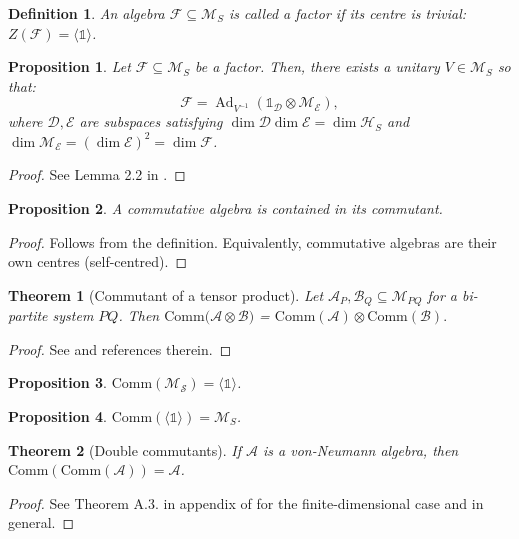 \documentclass[11pt, twocolumn, floatfix, superscriptaddress, aps, prb, raggedbottom]{revtex4-2}
\newtheorem{theorem}{Theorem}[section]
\newtheorem{definition}{Definition}[section]
\newtheorem{proposition}{Proposition}[section]
\newcommand\marcell[1]{\textcolor{red}{\textbf{#1}}}
\newcommand{\comm}{\mathrm{Comm}}
\newcommand{\Id}{\mathds{1}}
\DeclareMathOperator{\Ad}{Ad}
\begin{document}
\begin{definition}
    An algebra $\mathcal{F}\subseteq\mathcal{M}_S$ is called a \textit{factor} if its centre is trivial: $Z(\mathcal{F}) = \langle \Id \rangle$.
\end{definition}
\begin{proposition}
    Let $\mathcal{F}\subseteq \mathcal{M}_S$ be a factor. Then, there exists a unitary $V\in \mathcal{M}_S$ so that:
    \begin{equation}
        \mathcal{F}= \Ad_{V^{-1}}(\Id_{\mathcal{D}} \otimes \mathcal{M}_{\mathcal{E}}), 
    \end{equation}
    where $\mathcal{D, E}$ are subspaces satisfying $\dim \mathcal{D} \dim \mathcal{E} = \dim \mathcal{H}_S$ and $\dim \mathcal{M}_{\mathcal{E}}=(\dim \mathcal{E})^2 = \dim \mathcal{F}$.
\end{proposition}
\begin{proof}
    See Lemma 2.2 in \cite{Bény2020}.
\end{proof}
\begin{proposition}
    A commutative algebra is contained in its commutant.
\end{proposition}
\begin{proof}
    Follows from the definition. Equivalently, commutative algebras are their own centres (self-centred).
\end{proof}

\begin{theorem}[Commutant of a tensor product]
    Let $\mathcal{A}_{P}, \mathcal{B}_Q \subseteq \mathcal{M}_{PQ}$ for a bi-partite system $PQ$. Then $\comm(\mathcal{A} \otimes \mathcal{B)}$ = $\comm(\mathcal{A}) \otimes \comm(\mathcal{B}).$
\end{theorem}
\begin{proof}
    See \cite{Rousseau1976} and references therein.
\end{proof}

\begin{proposition}
    $\comm(\mathcal{M_S}) = \langle \Id \rangle$.
\end{proposition}
\begin{proposition}
    $\comm(\langle \Id \rangle) = \mathcal{M}_S$.
\end{proposition}
\begin{theorem}[Double commutants]
    If $\mathcal{A}$ is a von-Neumann algebra, then $\comm(\comm(\mathcal{A})) = \mathcal{A}$.
\end{theorem}
\begin{proof}
    See Theorem A.3. in appendix of \cite{Harlow2017} for the finite-dimensional case and \cite{Landsman1998_notes} in general.
\end{proof}
\end{document}

